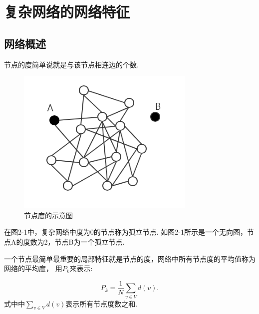 \documentclass[bachelor,adobefonts]{jnuthesis}
\begin{document}





\section{复杂网络的网络特征}
\subsection{网络概述}
节点的度简单说就是与该节点相连边的个数.

\begin{figure}[h!]
  \centering
  \includegraphics[width=0.6\linewidth]{Wwuxiangtu.png}
  \caption{节点度的示意图}
\end{figure}

在图2-1中，复杂网络中度为0的节点称为孤立节点.
如图2-1所示是一个无向图，节点A的度数为2，节点B为一个孤立节点.

一个节点最简单最重要的局部特征就是节点的度，网络中所有节点度的平均值称为网络的平均度，
用$P_k$来表示:

\begin{equation}
P_k= \frac{1}{N} \sum_{v \in V}^{}d(v).
\end{equation}
式中中$\sum_{v \in V}^{}d(v)$表示所有节点度数之和.
\end{document}
